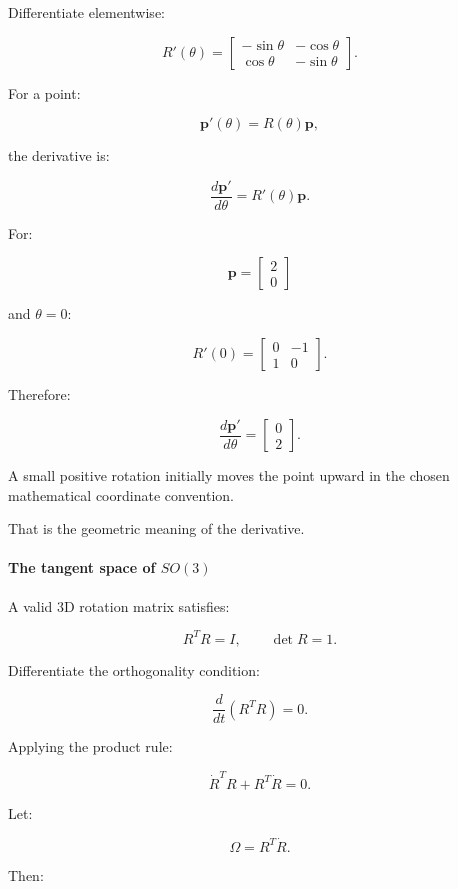 Differentiate elementwise:

\[
\boxed{ R'(\theta)= \begin{bmatrix} -\sin\theta&-\cos\theta\\ \cos\theta&-\sin\theta \end{bmatrix} }.
\]

For a point:

\[
\mathbf p'(\theta)=R(\theta)\mathbf p,
\]

the derivative is:

\[
\boxed{ \frac{d\mathbf p'}{d\theta} = R'(\theta)\mathbf p }.
\]

For:

\[
\mathbf p= \begin{bmatrix} 2\\0 \end{bmatrix}
\]

and \(\theta=0\):

\[
R'(0)= \begin{bmatrix} 0&-1\\ 1&0 \end{bmatrix}.
\]

Therefore:

\[
\frac{d\mathbf p'}{d\theta} = \begin{bmatrix} 0\\2 \end{bmatrix}.
\]

A small positive rotation initially moves the point upward in the chosen mathematical coordinate convention.

That is the geometric meaning of the derivative.

\paragraph{\texorpdfstring{The tangent space of \(SO(3)\)}{The tangent space of SO(3)}}\label{the-tangent-space-of-so3}

A valid 3D rotation matrix satisfies:

\[
R^TR=I, \qquad \det R=1.
\]

Differentiate the orthogonality condition:

\[
\frac d{dt}(R^TR)=0.
\]

Applying the product rule:

\[
\dot R^TR+R^T\dot R=0.
\]

Let:

\[
\Omega=R^T\dot R.
\]

Then:

